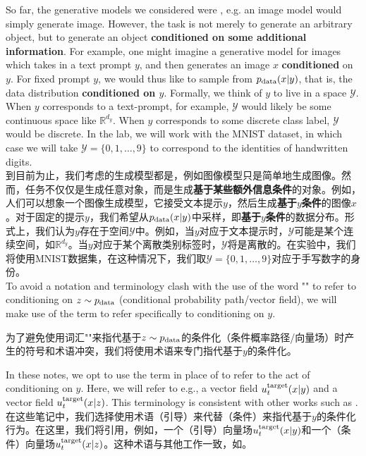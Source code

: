 So far, the generative models we considered were , e.g. an image model would simply generate  image. However, the task is not merely to generate an arbitrary object, but to generate an object \textbf{\sffamily conditioned on some additional information}. For example, one might imagine a generative model for images which takes in a text prompt $y$, and then generates an image $x$ \textbf{\sffamily conditioned} on $y$. For fixed prompt $y$, we would thus like to sample from $p_{\rm{data}}(x|y)$, that is, the data distribution \textbf{\sffamily conditioned on $y$}. Formally, we think of $y$ to live in a space $\mathcal{Y}$. When $y$ corresponds to a text-prompt, for example, $\mathcal{Y}$ would likely be some continuous space like $\mathbb{R}^{d_y}$. When $y$ corresponds to some discrete class label, $\mathcal{Y}$ would be discrete. In the lab, we will work with the MNIST dataset, in which case we will take $\mathcal{Y} = \{0,1,\dots,9\}$ to correspond to the identities of handwritten digits.\\

到目前为止，我们考虑的生成模型都是，例如图像模型只是简单地生成图像。然而，任务不仅仅是生成任意对象，而是生成\textbf{\sffamily 基于某些额外信息条件}的对象。例如，人们可以想象一个图像生成模型，它接受文本提示$y$，然后生成\textbf{\sffamily 基于}$y$\textbf{\sffamily 条件}的图像$x$。对于固定的提示$y$，我们希望从$p_{\rm{data}}(x|y)$中采样，即\textbf{\sffamily 基于$y$条件}的数据分布。形式上，我们认为$y$存在于空间$\mathcal{Y}$中。例如，当$y$对应于文本提示时，$\mathcal{Y}$可能是某个连续空间，如$\mathbb{R}^{d_y}$。当$y$对应于某个离散类别标签时，$\mathcal{Y}$将是离散的。在实验中，我们将使用MNIST数据集，在这种情况下，我们取$\mathcal{Y} = \{0,1,\dots,9\}$对应于手写数字的身份。\\

To avoid a notation and terminology clash with the use of the word "" to refer to conditioning on $z \sim p_{\rm{data}}$ (conditional probability path/vector field), we will make use of the term  to refer specifically to conditioning on $y$.

为了避免使用词汇""来指代基于$z \sim p_{\rm{data}}$的条件化（条件概率路径/向量场）时产生的符号和术语冲突，我们将使用术语来专门指代基于$y$的条件化。
\begin{remarkbox}
    In these notes, we opt to use the term  in place of  to refer to the act of conditioning on $y$. Here, we will refer to e.g., a  vector field $u^{\text{target}}_t(x|y)$ and a  vector field $u^{\text{target}}_t(x|z)$. This terminology is consistent with other works such as \cite{lipman2024flow}. \\
    在这些笔记中，我们选择使用术语（引导）来代替（条件）来指代基于$y$的条件化行为。在这里，我们将引用，例如，一个（引导）向量场$u^{\text{target}}_t(x|y)$和一个（条件）向量场$u^{\text{target}}_t(x|z)$。这种术语与其他工作一致，如\cite{lipman2024flow}。
\end{remarkbox}

